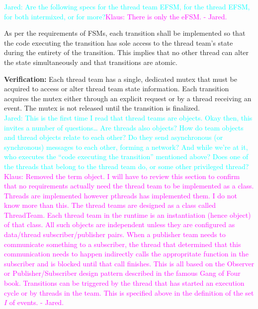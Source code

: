 \documentclass{article}
\newcommand{\Jared}[1]          {\textcolor{cyan}{Jared: #1}}
\newcommand{\KlausRfromJO}[1]   {\textcolor{magenta}{Klaus: #1 - Jared.}}
\begin{document}
\Jared{Are the following specs for the thread team EFSM, for the thread EFSM,
for both intermixed, or for more?}\KlausRfromJO{There is only the eFSM.}

\begin{spec}
\label{spec:Runtime_AtomicTransition}
As per the requirements of FSMs, each transition shall be implemented so that
the code executing the transition has sole access to the thread team's state
during the entirety of the transition.  This implies that no other thread can
alter the state simultaneously and that transitions are atomic.
\end{spec}
\textbf{Verification:}\hspace{0.125in}  Each thread team has a single,
dedicated mutex that must be acquired to access or alter thread team state
information.  Each transition acquires the mutex either through an explicit
request or by a thread receiving an event.  The mutex is not released until
the transition is finalized.\\

\Jared{This is the first time I read that thread teams are objects.
Okay then, this invites a number of questions\ldots
Are threads also objects? How do team objects and thread
objects relate to each other?  Do they send asynchronous (or synchronous)
messages to each other, forming a network?
And while we're at it, who executes the ``code executing the transition'' mentioned above?
Does one of the threads that belong to the thread team do, or some other
privileged thread?}\KlausRfromJO{Removed the term object.  I will have to review
this section to confirm that no requirements actually need the thread team to be
implemented as a class.  Threads are implemented however pthreads has
implemented them.  I do not know more than this.  The thread teams are designed
as a class called ThreadTeam.  Each thread team in the runtime is an
instantiation (hence object) of that class.  All such objects are independent
unless they are configured as data/thread subscriber/publisher pairs.  When a
publisher team needs to communicate something to a subscriber, the thread that
determined that this communication needs to happen indirectly calls the
appropritate function in the subscriber and is blocked until that call finishes.
This is all based on the Observer or Publisher/Subscriber design pattern
described in the famous Gang of Four book.  Transitions can be triggered by the
thread that has started an execution cycle or by threads in the team.  This is
specified above in the definition of the set $I$ of events.}
\end{document}
